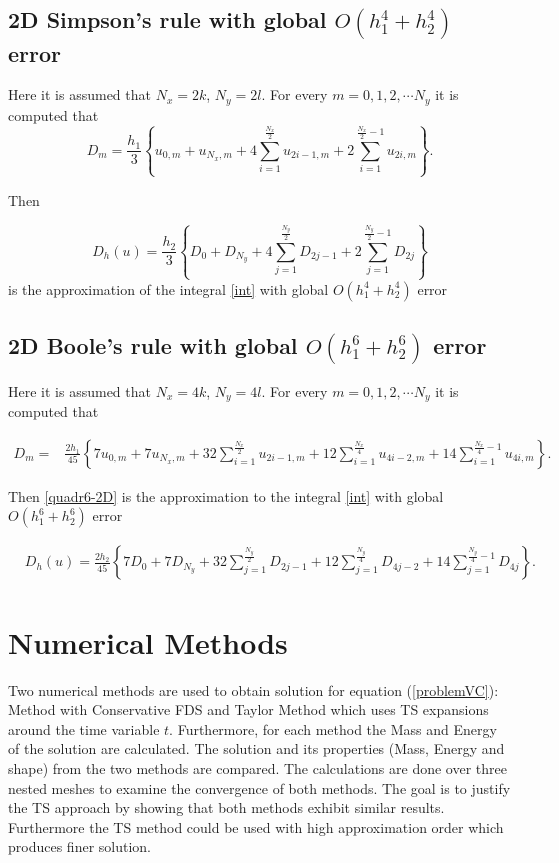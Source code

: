 \documentclass[%
 aip,
cp,  %
 amsmath,amssymb,%
 reprint,%
]{revtex4-2}
\newcommand{\rf}[1]{(\ref{#1})}
\begin{document}
\subsection{ 2D Simpson's rule with global $O(h_1^4+h_2^4)$ error}

Here it is assumed that $N_x=2k$, $N_y=2 l$. For every $m=0,1,2,\cdots N_y$ it is computed that 
$$D_m= \frac{h_1 }{3} 
\left\{ u_{0,m}+u_{N_x,m}+ 4 \sum_{i=1}^{\frac{N_x}{2}}   u_{2i-1,m}
 +2 \sum_{i=1}^{\frac{N_x}{2}-1} u_{2i,m} \right\}.$$


Then 

\begin{equation}\label{quadr4}
D_h(u)=\frac{h_2 }{3} 
\left\{ D_{0}+D_{N_y}+ 4 \sum_{j=1}^{\frac{N_y}{2}}   D_{2j-1}
 +2 \sum_{j=1}^{{\frac{N_y}{2}}-1} D_{2j} \right\}
\end{equation}
is the approximation of the integral \eqref{int} with global $O(h_1^4+h_2^4)$ error


\subsection{ 2D Boole's rule with global $O(h_1^6+h_2^6)$ error }
Here it is assumed that $N_x=4k$, $N_y=4 l$. For every $m=0,1,2,\cdots N_y$ it is computed that

\begin{align*}
D_m =& \frac{2h_1}{45} 
\left\{
7u_{0,m}+7u_{N_x,m}+32 \sum_{i=1}^{\frac{N_x}{2}}u_{2i-1,m}
+12\sum_{i=1}^{\frac{N_x}{4}}u_{4i-2,m}
+14 \sum_{i=1}^{\frac{N_x}{4}-1}u_{4i,m}
\right\}.
\end{align*}


Then \eqref{quadr6-2D} is the approximation to the integral \eqref{int} with global $O(h_1^6+h_2^6)$ error

\begin{align}\label{quadr6-2D}
&D_h(u) =
\frac{2h_2}{45} 
\left\{
7D_{0}+7D_{N_y}+32 \sum_{j=1}^{\frac{N_y}{2}}D_{2j-1}
+12\sum_{j=1}^{\frac{N_y}{4}}D_{4j-2}
+14 \sum_{j=1}^{\frac{N_y}{4}-1}D_{4j}
\right\}.
\end{align}

\section{Numerical Methods}

Two numerical methods are used to obtain solution for equation \rf{problemVC}: Method with Conservative FDS and Taylor Method which uses TS expansions around the time variable $t$. Furthermore, for each method the Mass and Energy of the solution are calculated. The solution and its properties (Mass, Energy and shape) from the two methods are compared. The calculations are done over three nested meshes to examine the convergence of both methods. The goal is to justify the TS approach by showing that both methods exhibit similar results. Furthermore the TS method could be used with high approximation order which produces finer solution.
\end{document}
